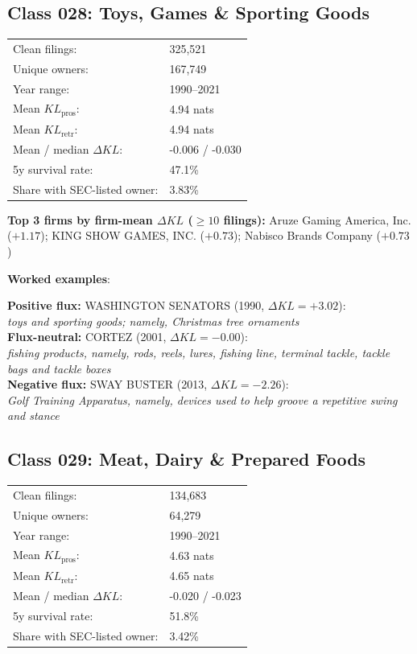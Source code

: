 \subsection*{Class 028: Toys, Games \& Sporting Goods}
\label{app:industry-028}

\begin{tabular}{ll}
Clean filings: & 325,521 \\
Unique owners: & 167,749 \\
Year range: & 1990--2021 \\
Mean $KL_\text{pros}$: & 4.94 nats \\
Mean $KL_\text{retr}$: & 4.94 nats \\
Mean / median $\Delta KL$: & -0.006 / -0.030 \\
5y survival rate: & 47.1\% \\
Share with SEC-listed owner: & 3.83\% \\
\end{tabular}

\textbf{Top 3 firms by firm-mean $\Delta KL$ ($\geq 10$ filings):} Aruze Gaming America, Inc. ($+1.17$); KING SHOW GAMES, INC. ($+0.73$); Nabisco Brands Company ($+0.73$)

\textbf{Worked examples}:

  \textbf{Positive flux:} \textsc{WASHINGTON SENATORS} (1990, $\Delta KL=+3.02$):\\
  \textit{toys and sporting goods; namely, Christmas tree ornaments}\\
  \textbf{Flux-neutral:} \textsc{CORTEZ} (2001, $\Delta KL=-0.00$):\\
  \textit{fishing products, namely, rods, reels, lures, fishing line, terminal tackle, tackle bags and tackle boxes}\\
  \textbf{Negative flux:} \textsc{SWAY BUSTER} (2013, $\Delta KL=-2.26$):\\
  \textit{Golf Training Apparatus, namely, devices used to help groove a repetitive swing and stance}\\

\subsection*{Class 029: Meat, Dairy \& Prepared Foods}
\label{app:industry-029}

\begin{tabular}{ll}
Clean filings: & 134,683 \\
Unique owners: & 64,279 \\
Year range: & 1990--2021 \\
Mean $KL_\text{pros}$: & 4.63 nats \\
Mean $KL_\text{retr}$: & 4.65 nats \\
Mean / median $\Delta KL$: & -0.020 / -0.023 \\
5y survival rate: & 51.8\% \\
Share with SEC-listed owner: & 3.42\% \\
\end{tabular}

